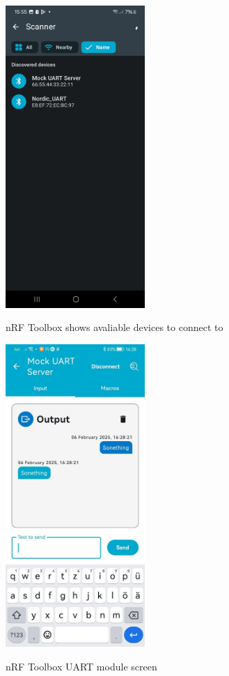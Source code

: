\begin{figure}[ht!]
\centering
 \caption{nRF Toolbox shows avaliable devices to connect to}
\includegraphics[width=200px]{graphics/nRF_toolbox_connect.jpg}
\label{f:Toolbox_connect}
\end{figure}

\begin{figure}[ht!]
\centering
 \caption{nRF Toolbox UART module screen}
\includegraphics[width=200px]{graphics/nRF_toolbox_messanger.jpg}
\label{f:Toolbox_connect}
\end{figure}

